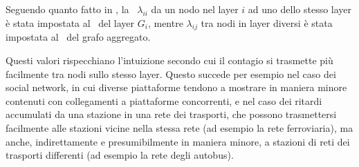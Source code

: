 Seguendo quanto fatto in \cite{basaras:infspmul}, la \epprob\ $\lambda_{ii}$ da un nodo nel 
layer $i$ ad uno dello stesso layer è stata impostata al \crepp\ del layer $G_i$, 
mentre $\lambda_{ij}$ tra nodi in layer diversi è stata impostata al \crepp\ del grafo 
aggregato. 

Questi valori rispecchiano l'intuizione secondo cui il contagio si trasmette 
più facilmente tra nodi sullo stesso layer. Questo succede per esempio nel caso dei social 
network, in cui diverse piattaforme tendono a mostrare in maniera minore contenuti con
collegamenti a piattaforme concorrenti, e nel caso dei ritardi accumulati da 
una stazione in una rete dei trasporti, che possono trasmettersi facilmente alle stazioni vicine 
nella stessa rete (ad esempio la rete ferroviaria), ma anche, indirettamente e presumibilmente in maniera
minore, a stazioni di reti dei trasporti differenti (ad esempio la rete degli autobus).